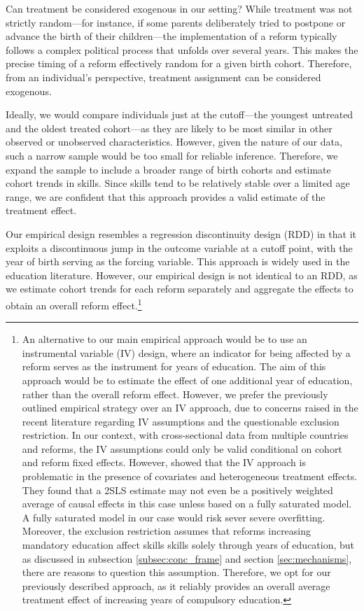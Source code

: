 Can treatment be considered exogenous in our setting? While treatment was not strictly random---for instance, if some parents deliberately tried to postpone or advance the birth of their children---the implementation of a reform typically follows a complex political process that unfolds over several years. This makes the precise timing of a reform effectively random for a given birth cohort. Therefore, from an individual's perspective, treatment assignment can be considered exogenous.

Ideally, we would compare individuals just at the cutoff---the youngest untreated and the oldest treated cohort---as they are likely to be most similar in other observed or unobserved characteristics. However, given the nature of our data, such a narrow sample would be too small for reliable inference. Therefore, we expand the sample to include a broader range of birth cohorts and estimate cohort trends in skills. Since skills tend to be relatively stable over a limited age range, we are confident that this approach provides a valid estimate of the treatment effect.

Our empirical design resembles a regression discontinuity design (RDD) \parencite{thistlethwaite_regression-discontinuity_1960} in that it exploits a discontinuous jump in the outcome variable at a cutoff point,  with the year of birth serving as the forcing variable. This approach is widely used in the education literature. However, our empirical design is not identical to an RDD, as we estimate cohort trends for each reform separately and aggregate the effects to obtain an overall reform effect.\footnote{
	An alternative to our main empirical approach would be to use an instrumental variable (IV) design, where an indicator for being affected by a reform serves as the instrument for years of education. The aim of this approach would be to estimate the effect of one additional year of education, rather than the overall reform effect. However, we prefer the previously outlined empirical strategy over an IV approach, due to concerns raised in the recent literature regarding IV assumptions and the questionable exclusion restriction. In our context, with cross-sectional data from multiple countries and reforms, the IV assumptions could only be valid conditional on cohort and reform fixed effects. However, \citet{blandhol_when_2022} showed that the IV approach is problematic in the presence of covariates and heterogeneous treatment effects. They found that a 2SLS estimate may not even be a positively weighted average of causal effects in this case unless based on a fully saturated model. A fully saturated model in our case would risk sever severe overfitting. Moreover, the exclusion restriction assumes that reforms increasing mandatory education affect skills skills solely through years of education, but as discussed in subsection \ref{subsec:conc_frame} and section \ref{sec:mechanisms}, there are reasons to question this assumption. Therefore, we opt for our previously described approach, as it reliably provides an overall average treatment effect of increasing years of compulsory education.
}

